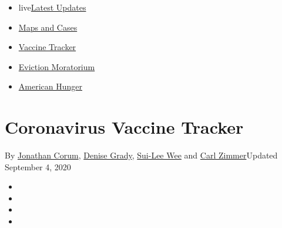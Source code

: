 \begin{itemize}
\tightlist
\item
  live\href{https://www.nytimes3xbfgragh.onion/2020/09/05/world/coronavirus-covid.html?name=styln-coronavirus-national\&region=TOP_BANNER\&block=storyline_menu_recirc\&action=click\&pgtype=Interactive\&impression_id=3faa8731-efb9-11ea-b2ff-0fe24421eae6\&variant=undefined}{Latest
  Updates}
\item
  \href{https://www.nytimes3xbfgragh.onion/interactive/2020/us/coronavirus-us-cases.html?name=styln-coronavirus-national\&region=TOP_BANNER\&block=storyline_menu_recirc\&action=click\&pgtype=Interactive\&impression_id=3faaae40-efb9-11ea-b2ff-0fe24421eae6\&variant=undefined}{Maps
  and Cases}
\item
  \href{https://www.nytimes3xbfgragh.onion/interactive/2020/science/coronavirus-vaccine-tracker.html?name=styln-coronavirus-national\&region=TOP_BANNER\&block=storyline_menu_recirc\&action=click\&pgtype=Interactive\&impression_id=3faaae41-efb9-11ea-b2ff-0fe24421eae6\&variant=undefined}{Vaccine
  Tracker}
\item
  \href{https://www.nytimes3xbfgragh.onion/2020/09/02/your-money/eviction-moratorium-covid.html?name=styln-coronavirus-national\&region=TOP_BANNER\&block=storyline_menu_recirc\&action=click\&pgtype=Interactive\&impression_id=3faaae42-efb9-11ea-b2ff-0fe24421eae6\&variant=undefined}{Eviction
  Moratorium}
\item
  \href{https://www.nytimes3xbfgragh.onion/interactive/2020/09/02/magazine/food-insecurity-hunger-us.html?name=styln-coronavirus-national\&region=TOP_BANNER\&block=storyline_menu_recirc\&action=click\&pgtype=Interactive\&impression_id=3faaae43-efb9-11ea-b2ff-0fe24421eae6\&variant=undefined}{American
  Hunger}
\end{itemize}

\hypertarget{coronavirus-vaccine-tracker}{%
\section{Coronavirus Vaccine
Tracker}\label{coronavirus-vaccine-tracker}}

By \href{https://www.nytimes3xbfgragh.onion/by/jonathan-corum}{Jonathan
Corum}, \href{https://www.nytimes3xbfgragh.onion/by/denise-grady}{Denise
Grady}, \href{https://www.nytimes3xbfgragh.onion/by/sui-lee-wee}{Sui-Lee
Wee} and \href{https://www.nytimes3xbfgragh.onion/by/carl-zimmer}{Carl
Zimmer}Updated September 4, 2020

\begin{itemize}
\item
\item
\item
\item
\end{itemize}


